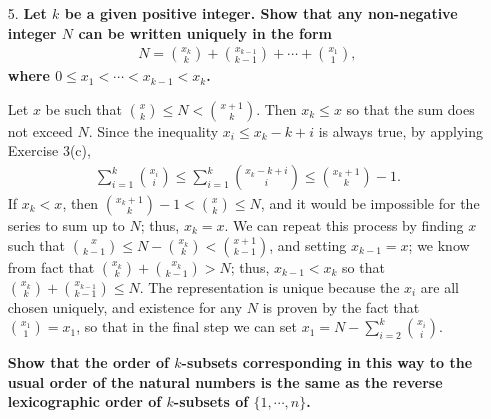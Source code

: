 \documentclass[a4paper,12pt]{article}
\begin{document}
\begin{enumerate}
    \item[5.]
        \boldmath
        \textbf{Let $k$ be a given positive integer. Show that any non-negative integer $N$ can be written uniquely in the form
        \begin{align*}
            N = \binom{x_k}{k} + \binom{x_{k - 1}}{k - 1} + \cdots + \binom{x_1}{1},
        \end{align*}
        where $0 \leq x_1 < \cdots < x_{k - 1} < x_k$.} \par
        \unboldmath
        Let $x$ be such that $\binom{x}{k} \leq N < \binom{x + 1}{k}$. Then $x_k \leq x$ so that the sum does not exceed $N$. Since the inequality $x_i \leq x_k - k + i$ is always true, by applying Exercise 3(c),
        \begin{align*}
            \sum_{i = 1}^k \binom{x_i}{i} \leq \sum_{i = 1}^k \binom{x_k - k + i}{i} \leq \binom{x_k + 1}{k} - 1.
        \end{align*}
        If $x_k < x$, then $\binom{x_k + 1}{k} - 1 < \binom{x}{k} \leq N$, and it would be impossible for the series to sum up to $N$; thus, $x_k = x$. We can repeat this process by finding $x$ such that $\binom{x}{k - 1} \leq N - \binom{x_k}{k} < \binom{x + 1}{k - 1}$, and setting $x_{k - 1} = x$; we know from fact that $\binom{x_k}{k} + \binom{x_k}{k - 1} > N$; thus, $x_{k - 1} < x_k$ so that $\binom{x_k}{k} + \binom{x_{k - 1}}{k - 1} \leq N$. The representation is unique because the $x_i$ are all chosen uniquely, and existence for any $N$ is proven by the fact that $\binom{x_1}{1} = x_1$, so that in the final step we can set $x_1 = N - \sum_{i = 2}^k \binom{x_i}{i}$. \par
        \boldmath
        \textbf{Show that the order of $k$-subsets corresponding in this way to the usual order of the natural numbers is the same as the reverse lexicographic order of $k$-subsets of $\{ 1, \cdots, n \}$.} \par
        \unboldmath
        \iffalse
            Then any possible representation has $x_k = x$, because if $x_k < x$, then we would have $\binom{x_k}{k} \leq N/k$, and because the $k - 1$ remaining terms are smaller than $\binom{x_k}{k}$, the terms would not be able to sum up to $N$. Also, we know from fact that $N - \binom{x_k}{k} < \binom{x_k}{k - 1}$. Thus, if we assume that
            \begin{align} \label{eq:assumption}
                N - \sum_{i = 0}^{m} \binom{x_{k - i}}{k - i} < \binom{x_{k - m}}{k - m - 1}
            \end{align}
            holds for all $m \geq 0$ and choose $x_{k - m - 1}$ such that
            \begin{align} \label{eq:choose}
                \binom{x_{k - m - 1}}{k - m - 1} \leq N - \sum_{i = 0}^m \binom{x_{k - i}}{k - i} < \binom{x_{k - m}}{k - m - 1},
            \end{align}
            then subtracting (\ref{eq:choose}) from (\ref{eq:assumption}) gives
            \begin{align*}
            \end{align*}
        \fi


\end{enumerate}
\end{document}
